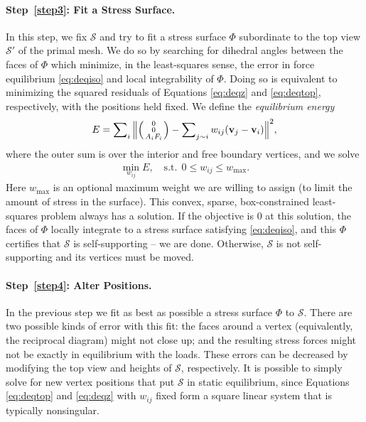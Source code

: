 \documentclass[review]{acmsiggraph}
\makeatletter
\def\Forcevector{\Big(\mbox{\scriptsize
	\def\arraystretch{0.8}\begin{tabular}{@{\,}c@{\,}}
	0 \\ 0 \\ $A_i F_i$
	\end{tabular}}\Big)}
\def\SS{{\mathcal S}}
\makeatother
\begin{document}
\paragraph{Step~\ref{step3}: Fit a Stress Surface.}

In this step, we fix $\SS$ and try to fit a stress surface $\Phi$ 
subordinate to the top view $\SS'$ of the primal mesh. We do so by 
searching for dihedral angles between the faces of $\Phi$ which minimize, 
in the least-squares sense, the error in force equilibrium 
\eqref{eq:deqiso} and local integrability of $\Phi$. Doing so is 
equivalent to minimizing the squared residuals of Equations 
\eqref{eq:deqz} and \eqref{eq:deqtop}, respectively, with the positions 
held fixed. We define the {\em equilibrium energy}
	\begin{align}
	E = \sum\nolimits_i \Big\| \Forcevector -
		\sum\nolimits_{j\sim i} w_{ij} (\vw_j-\vw_i) \Big\|^2,
	\label{eq:eenergy}
	\end{align}
 where the outer sum is over the interior and free boundary vertices,
and we solve
	\begin{align}
	\min_{w_{ij}} E,
	\quad
	\textrm{s.t.}\ \
		0 \leq w_{ij} \leq w_{\max}.
	\label{eq:wbounds}
	\end{align}
 Here $w_{\max}$ is an optional maximum weight we are willing to assign 
(to limit the amount of stress in the surface). This convex, sparse, 
box-constrained least-squares problem \cite{BCLS} always has a solution. 
If the objective is $0$ at this solution, the faces of $\Phi$ locally 
integrate to a stress surface satisfying \eqref{eq:deqiso}, and this $\Phi$ 
certifies that $\SS$ is self-supporting -- we are done. Otherwise, $\SS$ 
is not self-supporting and its vertices must be moved.

\paragraph{Step~\ref{step4}: Alter Positions.} In the previous step we fit 
as best as possible a stress surface $\Phi$ to $\SS$. There are two 
possible kinds of error with this fit: the faces around a vertex 
(equivalently, the reciprocal diagram) might not close up; and the 
resulting stress forces might not be exactly in equilibrium with the 
loads. These errors can be decreased by modifying the top view and heights 
of $\SS$, respectively. It is possible to simply solve for new vertex 
positions that put $\SS$ in static equilibrium, since Equations 
\eqref{eq:deqtop} and \eqref{eq:deqz} with $w_{ij}$ fixed form a square 
linear system that is typically nonsingular.
\end{document}
